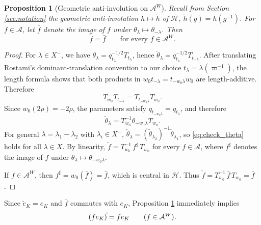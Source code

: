 \documentclass[12pt]{article}
\numberwithin{equation}{section}
\newtheorem{proposition}[theorem]{Proposition}
\theoremstyle{definition}
\theoremstyle{remark}
\theoremstyle{plain}
\begin{document}
\begin{proposition}[Geometric anti-involution on $\mathcal{A}^W$] \label{prop:anti_involution_center}
Recall from Section \ref{sec:notation} the geometric anti-involution $h \mapsto \check{h}$ of $\mathcal{H}$, $\check{h}(g) = h(g^{-1})$. For $f \in \mathcal{A}$, let $\bar{f}$ denote the image of $f$ under $\theta_\lambda \mapsto \theta_{-\lambda}$. Then
\begin{equation*}
\check{f} = \bar{f} \qquad \text{for every } f \in \mathcal{A}^W.
\end{equation*}
\end{proposition}
\begin{proof}
For $\lambda \in X^-$, we have $\theta_\lambda = q_{t_\lambda}^{-1/2} T_{t_\lambda}$, hence $\check{\theta}_\lambda = q_{t_\lambda}^{-1/2} T_{t_{-\lambda}}$. After translating Rostami's dominant-translation convention to our choice $t_\lambda=\lambda(\varpi^{-1})$, the length formula \cite[Lemma 5.2.1(iii)--(iv)]{Rostami} shows that both products in $w_0t_{-\lambda} = t_{-w_0\lambda}w_0$ are length-additive. Therefore
\begin{equation*}
T_{w_0} T_{t_{-\lambda}} = T_{t_{-w_0\lambda}} T_{w_0}.
\end{equation*}
Since $w_0(2\rho) = -2\rho$, the parameters satisfy $q_{t_{-w_0\lambda}} = q_{t_\lambda}$, and therefore
\begin{equation}\label{eq:check_theta}
\check{\theta}_\lambda = T_{w_0}^{-1}\theta_{-w_0\lambda}T_{w_0}.
\end{equation}
For general $\lambda = \lambda_1 - \lambda_2$ with $\lambda_i \in X^-$, $\check{\theta}_\lambda = (\check{\theta}_{\lambda_2})^{-1}\check{\theta}_{\lambda_1}$, so \eqref{eq:check_theta} holds for all $\lambda \in X$. By linearity, $\check{f} = T_{w_0}^{-1}\, f^{\sharp}\, T_{w_0}$ for every $f \in \mathcal{A}$, where $f^{\sharp}$ denotes the image of $f$ under $\theta_\lambda \mapsto \theta_{-w_0\lambda}$.

If $f \in \mathcal{A}^W$, then $f^{\sharp} = w_0(\bar{f}) = \bar{f}$, which is central in $\mathcal{H}$. Thus $\check{f} = T_{w_0}^{-1}\,\bar{f}\,T_{w_0} = \bar{f}$.
\end{proof}

Since $\check{e}_K = e_K$ and $\bar{f}$ commutes with $e_K$, Proposition \ref{prop:anti_involution_center} immediately implies
\begin{equation}\label{eq:anti_involution_spherical}
(f e_K)\check{\vphantom{f}} = \bar{f}e_K \qquad (f \in \mathcal{A}^W).
\end{equation}
\end{document}
